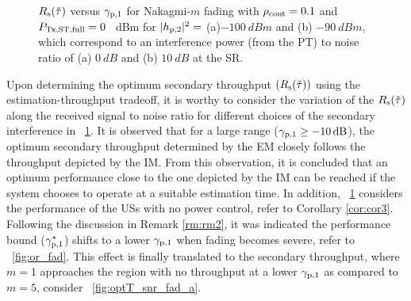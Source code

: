 {\begin{figure}[!ht]
{
\label{fig:optT_snr_fad_b}
}
\vspace{-2mm}
\caption{$R_{\text{s}}(\tilde{\tau})$ versus ${\gamma}_{\text{p,1}}$ for Nakagmi-$m$ fading with $\rho_{\text{cont}} = 0.1$ and $P_{\text{Tx,ST,full}} = 0$ \SI{}{dBm} for $|h_{\text{p,2}}|^2 =$ (a)$\SI{-100}{dBm}$ and (b) $ \SI{-90}{dBm}$, which correspond to an interference power (from the PT) to noise ratio of (a) $\SI{0}{dB}$ and (b) $\SI{10}{dB}$ at the SR.}
\label{fig:optT_snr_fad}
\end{figure}

Upon determining the optimum secondary throughput $(R_{\text{s}}(\tilde{\tau}))$ using the estimation-throughput tradeoff, it is worthy to consider the variation of the $R_{\text{s}}(\tilde{\tau})$ along the received signal to noise ratio for different choices of the secondary interference in \figurename~\ref{fig:optT_snr_fad}. It is observed that for a large range (${\gamma}_{\text{p,1}} \ge \SI{-10}{dB}$), the optimum secondary throughput determined by the EM closely follows the throughput depicted by the IM. From this observation, it is concluded that an optimum performance close to the one depicted by the IM can be reached if the system chooses to operate at a suitable estimation time. In addition, \figurename~\ref{fig:optT_snr_fad} considers the performance of the USs with no power control, refer to Corollary \ref{cor:cor3}. Following the discussion in Remark \ref{rm:rm2}, it was indicated the performance bound (${\gamma}_{\text{p,1}}^*$) shifts to a lower ${\gamma}_{\text{p,1}}$ when fading becomes severe, refer to \figurename~\ref{fig:or_fad}. This effect is finally translated to the secondary throughput, where $m = 1$ approaches the region with no throughput at a lower ${\gamma}_{\text{p,1}}$ as compared to $m = 5$, consider \figurename~\ref{fig:optT_snr_fad_a}. 
}
